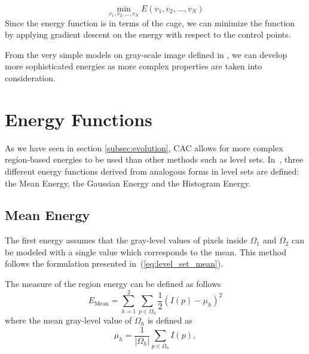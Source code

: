 \begin{equation}
\min\limits_{{v_1, v_2, ..., v_N}}  E(v_1,v_2,\dots, v_N)
\end{equation}
Since the energy function is in terms of the cage, we can minimize the function by applying gradient descent on the energy with respect to the control points.

From the very simple models on gray-scale image defined in \cite{ipcac2015}, we can develop more sophisticated energies as more complex properties are taken into consideration. 



\section{Energy Functions}  
\label{subsec:energy_functions}


 As we have seen in section \ref{subsec:evolution}, CAC allows for more complex region-based energies to be used than other methods such as level sets. In~\cite{ipcac2015}, three different energy functions derived from analogous forms in level sets are defined: the Mean Energy, the Gaussian Energy and the Histogram Energy.

\subsection{Mean Energy}
\label{subsubsec:mean_energy}

The first energy assumes that the gray-level values of pixels inside $\Omega_1$ and
$\Omega_2$ can be modeled with a single value which corresponds to the mean.
This method follows the formulation presented in~(\ref{eq:level_set_mean}).

The measure of the region energy can be defined as follows
\begin{equation}
E_{\mathrm{Mean}} = \sum_{h=1}^2 \sum_{p \in \Omega_{h}} \frac{1}{2}(I(p)-\mu_{h})^2
\end{equation}
where the mean gray-level value of $\Omega_h$ is defined as
\begin{equation}
\label{eq:mean}
\mu_{h} = \frac{1}{|\Omega_{h}|} \sum_{p \in \Omega_{h}}I(p),
\end{equation}

